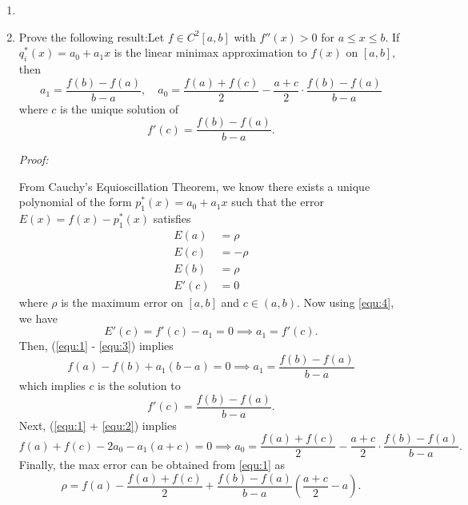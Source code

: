 \documentclass[a4paper,12pt]{article}
\newenvironment{proof}[2][$\square$]
    {\setlength{\parskip}{0pt}\par\textit{Proof:} #2\setlength{\parskip}{0.25cm}
        \savebox{\qed}{#1}
        \begin{adjustwidth}{\widthof{Proof:}}{}
    }
    {
        \hfill\usebox{\qed}\end{adjustwidth}
    }
\begin{document}
\begin{enumerate}[label = \arabic*.]
	\item 
	
	\item Prove the following result:Let $ f \in C^2 [a,b] $ with $ f''(x) > 0 $ for $ a \leq x \leq b $. If $ q_i^*(x) = a_0 + a_1 x $ is the linear minimax approximation to $ f(x) $ on $ [a,b] $, then 
	\[
		a_1 = \frac{f(b) - f(a)}{b - a}, \quad a_0 = \frac{f(a) + f(c)}{2} - \frac{a + c}{2} \cdot \frac{f(b) - f(a)}{b - a}
	\]
	where $ c $ is the unique solution of
	\[
		f'(c) = \frac{f(b) - f(a)}{b - a}.
	\]
	
	\begin{proof}{}
		From Cauchy's Equioscillation Theorem, we know there exists a unique polynomial of the form $ p_1^*(x) = a_0+ a_1 x $ such that the error $ E(x) = f(x) - p_1^*(x) $ satisfies
		\begin{align}
			E(a) &= \rho \label{equ:1} \\
			E(c) &= -\rho \label{equ:2} \\ 
			E(b) &= \rho \label{equ:3} \\
			E'(c) &= 0 \label{equ:4}
		\end{align}
		where $ \rho $ is the maximum error on $ [a, b] $ and $ c \in (a,b) $. Now using \eqref{equ:4}, we have
		\[
			E'(c) = f'(c) - a_1 = 0 \implies a_1 = f'(c).
		\]
		Then, (\eqref{equ:1} - \eqref{equ:3}) implies
		\[
			f(a) - f(b) + a_1(b - a) = 0 \implies \boxed{a_1 = \frac{f(b) - f(a)}{b - a}}
		\]
		which implies $ c $ is the solution to 
		\[
			\boxed{f'(c) = \frac{f(b) - f(a)}{b - a}}.
		\]
		Next, (\eqref{equ:1} + \eqref{equ:2}) implies
		\[
			f(a) + f(c) - 2a_0 - a_1 (a + c) = 0 \implies \boxed{a_0 = \frac{f(a) + f(c)}{2} - \frac{a + c}{2} \cdot \frac{f(b) - f(a)}{b - a}}.
		\]
		Finally, the max error can be obtained from \eqref{equ:1} as
		\[
			\boxed{\rho = f(a) - \frac{f(a) + f(c)}{2} + \frac{f(b) - f(a)}{b - a} \left(\frac{a + c}{2} -  a\right)}.
		\]
	\end{proof}
\end{enumerate}
\end{document}
